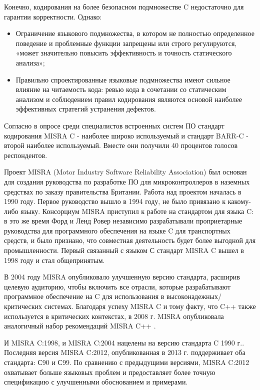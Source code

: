 Конечно, кодирования на более безопасном подмножестве C недостаточно для гарантии корректности. Однако:

\begin{itemize}
    \item Ограничение языкового подмножества, в котором не полностью определенное поведение и 
    проблемные функции запрещены или строго регулируются, «может значительно повысить эффективность и  
    точность статического анализа»\cite{astreeConf};
    \item Правильно спроектированные языковые подмножества имеют сильное влияние на читаемость кода:
    ревью кода в сочетании со статическим анализом и соблюдением правил кодирования являются основой 
    наиболее эффективных стратегий устранения дефектов.  
\end{itemize}

Согласно\cite{bagnara2020barrc2018} в опросе среди специалистов встроенных систем ПО  стандарт кодирования MISRA C\cite{Misrac1998} - наиболее широко 
используемый и стандарт BARR-C\cite{barrc} - второй наиболее используемый. Вместе они получили 40 процентов голосов респондентов.  

Проект MISRA (Motor Industry Software Reliability Association) был основан для создания руководства по разработке ПО для микроконтроллеров в 
наземных средствах по заказу правительства Британии. Работа над проектом началась в 1990 году.  Первое руководство вышло в 1994 году, не 
было привязано к какому-либо языку. Консорциум MISRA приступил к работе на стандартом для языка C: в это же время Форд и Ленд Ровер независимо разрабатывали проприетарные 
руководства для программного обеспечения на языке C для транспортных средств, и было признано, что совместная 
деятельность будет более выгодной для промышленности. Первый связанный с языком С стандарт MISRA C\cite{Misrac1998} вышел в 1998 году и стал общепринятым. 

В 2004 году MISRA опубликовало улучшенную версию стандарта\cite{Misrac2004}, расширив целевую аудиторию, 
чтобы включить все отрасли, которые разрабатывают программное обеспечение на C для использования в 
высоконадежных/критических системах. Благодаря успеху MISRA C и тому факту, что C++ также используется в 
критических контекстах, в 2008 г. MISRA опубликовала аналогичный набор рекомендаций MISRA C++
\cite{Misrac2008}.

И MISRA C:1998, и MISRA C:2004 нацелены на версию стандарта C 1990 г.\cite{ISOIEC99899in1990}. Последняя 
версия MISRA C:2012, опубликованная в 2013 г.\cite{Misrac2012} поддерживает оба стандарта: С90 и 
С99\cite{ISOIEC99899in1999}. По сравнению с предыдущими версиями, MISRA C:2012 охватывает больше языковых 
проблем и предоставляет более точную спецификацию с улучшенными обоснованием и примерами.

